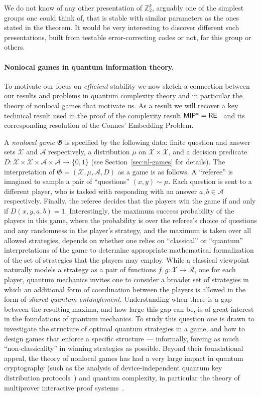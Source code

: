 \documentclass[11pt]{article}
\theoremstyle{definition}
\newcommand{\Z}{\ensuremath{\mathbb{Z}}}
\newcommand{\mA}{\ensuremath{\mathcal{A}}}
\newcommand{\mX}{\ensuremath{\mathcal{X}}}
\newcommand{\game}{\mathfrak{G}}
\begin{document}
We do not know of any other presentation of $\Z_2^k$, arguably one of the simplest groups one could think of, that is stable with similar parameters as the ones stated in the theorem. It would be very interesting to discover different such presentations, built from testable error-correcting codes or not, for this group or others. 

\paragraph{Nonlocal games in quantum information theory.}
To motivate our focus on \emph{efficient} stability we now sketch a connection between our results and problems in quantum complexity theory and in particular the theory of nonlocal games that motivate us. As a result we will recover a key technical result used in the proof of the complexity result $\sf MIP^* = \sf RE$~\cite{ji2020mip} and its corresponding resolution of the Connes' Embedding Problem.

 A \emph{nonlocal game} $\game$ is specified by the following data: finite question and answer sets $\mX$ and $\mA$ respectively, a distribution $\mu$ on $\mX\times \mX$, and a decision predicate $D:\mX\times \mX\times \mA\times \mA\to \{0,1\}$ (see Section~\ref{sec:nl-games} for details). The interpretation of $\game=(\mX,\mu,\mA,D)$ as a game is as follows. A ``referee'' is imagined to sample a pair of ``questions'' $(x,y)\sim \mu$. Each question is sent to a different player, who is tasked with responding with an answer $a,b\in \mA$ respectively. Finally, the referee decides that the players win the game if and only if $D(x,y,a,b)=1$. Interestingly, the maximum success probability of the players in this game, where the probability is over the referee's choice of questions and any randomness in the player's strategy, and the maximum is taken over all allowed strategies, depends on whether one relies on ``classical'' or ``quantum'' interpretations of the game to determine appropriate mathematical formalization of the set of strategies that the players may employ. While a classical viewpoint naturally models a strategy as a pair of functions $f,g:\mX\to\mA$, one for each player, quantum mechanics invites one to consider a broader set of strategies in which an additional form of coordination between the players is allowed in the form of \emph{shared quantum entanglement}. Understanding when there is a gap between the resulting maxima, and how large this gap can be, is of great interest in the foundations of quantum mechanics. To study this question one is drawn to investigate the structure of optimal quantum strategies in a game, and how to design games that enforce a specific structure --- informally, forcing as much ``non-classicality'' in winning strategies as possible. Beyond their foundational appeal, the theory of nonlocal games has had a very large impact in quantum cryptography (such as the analysis of device-independent quantum key distribution protocols~\cite{vazirani2019fully,arnon2019simple}) and quantum complexity, in particular the theory of multiprover interactive proof systems~\cite{cleve2004consequences}.
\end{document}
